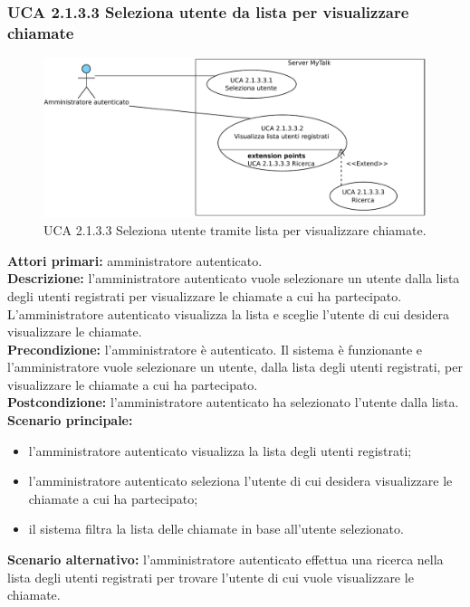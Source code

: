 \newpage

\subsubsection{UCA 2.1.3.3 Seleziona utente da lista per visualizzare chiamate}

\begin{figure}[htbp]
\centering
\includegraphics[scale=0.7]{./casi_uso/UCA2-1-3-3.pdf}
\caption{UCA 2.1.3.3 Seleziona utente tramite lista per visualizzare chiamate.}
\end{figure}

\noindent
\textbf{Attori primari:} amministratore autenticato.\\
\textbf{Descrizione:} l'amministratore autenticato vuole selezionare un utente dalla lista degli utenti registrati per visualizzare le chiamate a cui ha partecipato. L'amministratore autenticato visualizza la lista e sceglie l'utente di cui desidera visualizzare le chiamate.\\%
\textbf{Precondizione:} l'amministratore è autenticato. Il sistema è funzionante e l'amministratore vuole selezionare un utente, dalla lista degli utenti registrati, per visualizzare le chiamate a cui ha partecipato.\\
\textbf{Postcondizione:} l'amministratore autenticato ha selezionato l'utente dalla lista. \\
\textbf{Scenario principale:}
\begin{itemize}
\item l'amministratore autenticato visualizza la lista degli utenti registrati;
\item l'amministratore autenticato seleziona l'utente di cui desidera visualizzare le chiamate a cui ha partecipato;
\item il sistema filtra la lista delle chiamate in base all'utente selezionato.
\end{itemize}
\textbf{Scenario alternativo:} l'amministratore autenticato effettua una ricerca nella lista degli utenti registrati per trovare l'utente di cui vuole visualizzare le chiamate.

